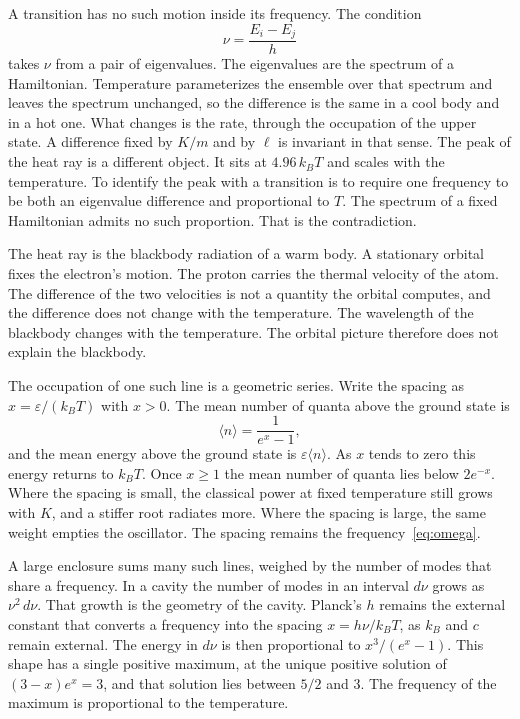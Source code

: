 \documentclass[a4paper]{article}
\begin{document}
A transition has no such motion inside its frequency. The condition
\begin{equation}
\label{eq:bohrnu}
\nu=\frac{E_i-E_j}{h}
\end{equation}
takes \(\nu\) from a pair of eigenvalues. The eigenvalues are the spectrum of a Hamiltonian. Temperature parameterizes the ensemble over that spectrum and leaves the spectrum unchanged, so the difference is the same in a cool body and in a hot one. What changes is the rate, through the occupation of the upper state. A difference fixed by \(K/m\) and by \(\ell\) is invariant in that sense. The peak of the heat ray is a different object. It sits at \(4.96\,k_B T\) and scales with the temperature. To identify the peak with a transition is to require one frequency to be both an eigenvalue difference and proportional to \(T\). The spectrum of a fixed Hamiltonian admits no such proportion. That is the contradiction.

The heat ray is the blackbody radiation of a warm body. A stationary orbital fixes the electron's motion. The proton carries the thermal velocity of the atom. The difference of the two velocities is not a quantity the orbital computes, and the difference does not change with the temperature. The wavelength of the blackbody changes with the temperature. The orbital picture therefore does not explain the blackbody.

The occupation of one such line is a geometric series. Write the spacing as \(x=\varepsilon/(k_B T)\) with \(x>0\). The mean number of quanta above the ground state is
\[
\langle n\rangle=\frac{1}{e^{x}-1},
\]
and the mean energy above the ground state is \(\varepsilon\langle n\rangle\). As \(x\) tends to zero this energy returns to \(k_B T\). Once \(x\ge 1\) the mean number of quanta lies below \(2e^{-x}\). Where the spacing is small, the classical power at fixed temperature still grows with \(K\), and a stiffer root radiates more. Where the spacing is large, the same weight empties the oscillator. The spacing remains the frequency~\eqref{eq:omega}.

A large enclosure sums many such lines, weighed by the number of modes that share a frequency. In a cavity the number of modes in an interval \(d\nu\) grows as \(\nu^{2}\,d\nu\). That growth is the geometry of the cavity. Planck's \(h\) remains the external constant that converts a frequency into the spacing \(x=h\nu/k_B T\), as \(k_B\) and \(c\) remain external. The energy in \(d\nu\) is then proportional to \(x^{3}/(e^{x}-1)\). This shape has a single positive maximum, at the unique positive solution of \((3-x)e^{x}=3\), and that solution lies between \(5/2\) and \(3\). The frequency of the maximum is proportional to the temperature.
\end{document}
